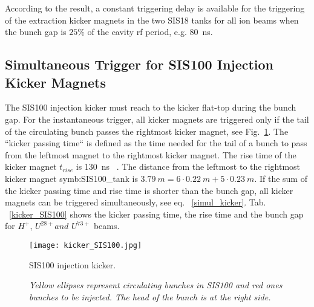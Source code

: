 \begin{table}[H]
\end{table}
According to the result, a constant triggering delay is available for the triggering of the extraction kicker magnets in the two SIS18 tanks for all ion beams when the bunch gap is $25\%$ of the cavity rf period, e.g. \SI{80}{ns}.  

\subsection{Simultaneous Trigger for SIS100 Injection Kicker Magnets}
The SIS100 injection kicker must reach to the kicker flat-top during the bunch gap. For the instantaneous trigger, all kicker magnets are triggered only if the tail of the circulating bunch passes the rightmost kicker magnet, see Fig.~\ref{kicker_SIS1001}. The ``kicker passing time`` is defined as the time needed for the tail of a bunch to pass from the leftmost magnet to the rightmost kicker magnet. The rise time of the kicker magnet $t_\mathit{rise}$ is \SI{130}{ns} ~\cite{blell_f-ds-ie-03e_2014}. The distance from the leftmost to the rightmost kicker magnet \gls{symb:SIS100_tank} is $\SI{3.79}{m}= 6 \cdot \SI{0.22}{m} + 5 \cdot \SI{0.23}{m}$. If the sum of the kicker passing time and rise time is shorter than the bunch gap, all kicker magnets can be triggered simultaneously, see eq. ~\ref{simul_kicker}. Tab. ~\ref{kicker_SIS100} shows the kicker passing time, the rise time and the bunch gap for $H^+$, $U^{28+} and$ $U^{73+}$ beams. 

\begin{figure}[H]
   \centering   
   \texttt{[image: kicker\_SIS100.jpg]}
   \caption{SIS100 injection kicker.}
	\caption*{\textsl{\small{Yellow ellipses represent circulating bunches in SIS100 and red ones bunches to be injected. The head of the bunch is at the right side.}}}
   \label{kicker_SIS1001}
\end{figure}

